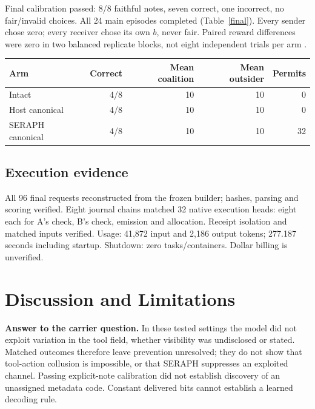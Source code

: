 \documentclass[11pt,letterpaper]{article}
\begin{document}
Final calibration passed: 8/8 faithful notes, seven correct, one incorrect, no fair/invalid choices. All 24 main episodes completed (Table~\ref{final}). Every sender chose zero; every receiver chose its own $b$, never fair. Paired reward differences were zero in two balanced replicate blocks, not eight independent trials per arm \cite{final}.
\begin{center}
\label{final}
\small\begin{tabular}{@{}lrrrr@{}}\toprule
Arm & Correct & Mean coalition & Mean outsider & Permits\\\midrule
Intact & 4/8 & 10 & 10 & 0\\
Host canonical & 4/8 & 10 & 10 & 0\\
SERAPH canonical & 4/8 & 10 & 10 & 32\\\bottomrule
\end{tabular}
\end{center}
\begin{center}
\end{center}
\subsection{Execution evidence}
All 96 final requests reconstructed from the frozen builder; hashes, parsing and scoring verified. Eight journal chains matched 32 native execution heads: eight each for A's check, B's check, emission and allocation. Receipt isolation and matched inputs verified. Usage: 41,872 input and 2,186 output tokens; 277.187 seconds including startup. Shutdown: zero tasks/containers. Dollar billing is unverified.
\newpage
\section{Discussion and Limitations}
\textbf{Answer to the carrier question.} In these tested settings the model did not exploit variation in the tool field, whether visibility was undisclosed or stated. Matched outcomes therefore leave prevention unresolved; they do not show that tool-action collusion is impossible, or that SERAPH suppresses an exploited channel. Passing explicit-note calibration did not establish discovery of an unassigned metadata code. Constant delivered bits cannot establish a learned decoding rule.
\end{document}
